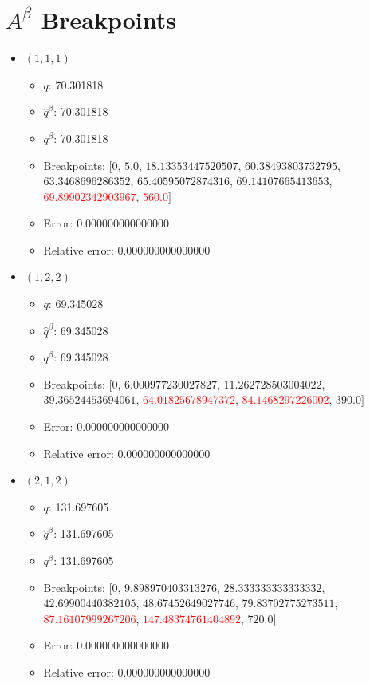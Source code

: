 \documentclass{article}%
\begin{document}
\section{$A^\beta$ Breakpoints}%
\thispagestyle{plain}%
\begin{itemize}%
	\item $(1, 1, 1)$%
	\begin{itemize}%
		\item $q$: 70.301818%
		\item $\hat{q}^\beta$: 70.301818%
		\item $q^\beta$: 70.301818%
		\item Breakpoints: $[$$0$, $5.0$, $18.13353447520507$, $60.38493803732795$, $63.3468696286352$, $65.40595072874316$, $69.14107665413653$, \textcolor{red}{$69.89902342903967$}, \textcolor{red}{$560.0$}$]$%
		\item Error: 0.000000000000000%
		\item Relative error: 0.000000000000000%
	\end{itemize}%
	\item $(1, 2, 2)$%
	\begin{itemize}%
		\item $q$: 69.345028%
		\item $\hat{q}^\beta$: 69.345028%
		\item $q^\beta$: 69.345028%
		\item Breakpoints: $[$$0$, $6.000977230027827$, $11.262728503004022$, $39.36524453694061$, \textcolor{red}{$64.01825678947372$}, \textcolor{red}{$84.1468297226002$}, $390.0$$]$%
		\item Error: 0.000000000000000%
		\item Relative error: 0.000000000000000%
	\end{itemize}%
	\item $(2, 1, 2)$%
	\begin{itemize}%
		\item $q$: 131.697605%
		\item $\hat{q}^\beta$: 131.697605%
		\item $q^\beta$: 131.697605%
		\item Breakpoints: $[$$0$, $9.898970403313276$, $28.333333333333332$, $42.69900440382105$, $48.67452649027746$, $79.83702775273511$, \textcolor{red}{$87.16107999267206$}, \textcolor{red}{$147.48374761404892$}, $720.0$$]$%
		\item Error: 0.000000000000000%
		\item Relative error: 0.000000000000000%
	\end{itemize}%

\end{itemize}
\end{document}
